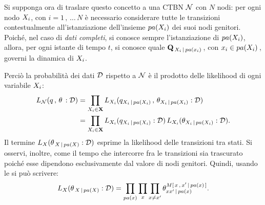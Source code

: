 Si supponga ora di traslare questo concetto a una \acl{CTBN} $\mathcal{N}$ con $N$ nodi: per ogni nodo $\mathnormal{X_i}$, con $i=1\,,\,\dotsc\,N$ è necessario considerare tutte le transizioni contestualmente all'istanziazione dell'insieme $pa(\mathnormal{X_i})$ dei suoi nodi genitori. Poiché, nel caso di \emph{dati completi}, si conosce sempre l'istanziazione di $pa(\mathnormal{X_i})$, allora, per ogni istante di tempo $t$, si conosce quale \im*{} $\mathbf{Q}_{\,\mathnormal{X_i}\,\arrowvert\,pa(x_i)}\,$, con $x_i\in pa(\mathnormal{X_i})\,$, governi la dinamica di $\mathnormal{X_i}$.

Perciò la probabilità dei dati $\mathcal{D}$ rispetto a $\mathcal{N}$ è il prodotto delle likelihood di ogni variabile $\mathnormal{X_i}$:
\begin{equation}
\begin{split}
L_{\mathcal{N}}(q\,,\,\theta\,:\mathcal{D})&=\prod_{\mathnormal{X_i}\in\mathbf{X}}L_{\mathnormal{X_i}}(q_{\mathnormal{X_i}\,\arrowvert\,pa(\mathnormal{X_i})}\,,\,\theta_{\mathnormal{X_i}\,\arrowvert\,pa(\mathnormal{X_i})}:\mathcal{D}) \\
&=\prod_{\mathnormal{X_i}\in\mathbf{X}}L_{\mathnormal{X_i}}(q_{\mathnormal{X_i}\,\arrowvert\,pa(\mathnormal{X_i})}:\mathcal{D})\,L_{\mathnormal{X_i}}(\theta_{\mathnormal{X_i}\,\arrowvert\,pa(\mathnormal{X_i})}:\mathcal{D})\text{.}
\end{split}
\end{equation}
Il termine $L_{\mathnormal{X}}(\theta_{\,\mathnormal{X}\,\arrowvert\,pa(\mathnormal{X})}:\mathcal{D})$ esprime la likelihood delle transizioni tra stati. Si osservi, inoltre, come il tempo che intercorre fra le transizioni sia trascurato poiché esse dipendono esclusivamente dal valore di nodi genitori. Quindi, usando le \emph{\stats{}} si può scrivere:
\[
L_{\setel{X}}(\theta_{\,\setel{X}\,\arrowvert\,pa(\setel{X})}:\conceptsym{D})=\prod_{pa(x)} \prod_{x} \prod_{x\neq x^{\prime}}\theta_{xx^{\prime}\,\arrowvert\,pa(x)}^{\mstat[x]{x^{\prime}\,\arrowvert\,pa(x)}}\text{.}
\]

